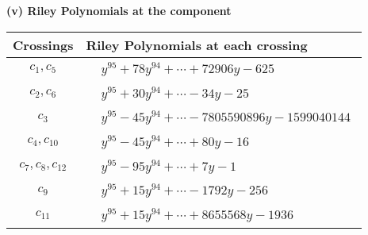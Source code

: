 \documentclass[1p]{elsarticle_modified}
\theoremstyle{definition}
\begin{document}
\newpage\renewcommand{\arraystretch}{1}
\flushleft \textbf{(v) Riley Polynomials at the component}\newline \\
\begin{tabular}{m{50pt}|m{274pt}}
Crossings & \hspace{64pt}Riley Polynomials at each crossing \\
\hline $$\begin{aligned}c_{1},c_{5}\end{aligned}$$&$\begin{aligned}
&y^{95}+78 y^{94}+\cdots+72906 y-625
\end{aligned}$\\
\hline $$\begin{aligned}c_{2},c_{6}\end{aligned}$$&$\begin{aligned}
&y^{95}+30 y^{94}+\cdots-34 y-25
\end{aligned}$\\
\hline $$\begin{aligned}c_{3}\end{aligned}$$&$\begin{aligned}
&y^{95}-45 y^{94}+\cdots-7805590896 y-1599040144
\end{aligned}$\\
\hline $$\begin{aligned}c_{4},c_{10}\end{aligned}$$&$\begin{aligned}
&y^{95}-45 y^{94}+\cdots+80 y-16
\end{aligned}$\\
\hline $$\begin{aligned}c_{7},c_{8},c_{12}\end{aligned}$$&$\begin{aligned}
&y^{95}-95 y^{94}+\cdots+7 y-1
\end{aligned}$\\
\hline $$\begin{aligned}c_{9}\end{aligned}$$&$\begin{aligned}
&y^{95}+15 y^{94}+\cdots-1792 y-256
\end{aligned}$\\
\hline $$\begin{aligned}c_{11}\end{aligned}$$&$\begin{aligned}
&y^{95}+15 y^{94}+\cdots+8655568 y-1936
\end{aligned}$\\
\hline
\end{tabular}\\~\\
\end{document}

